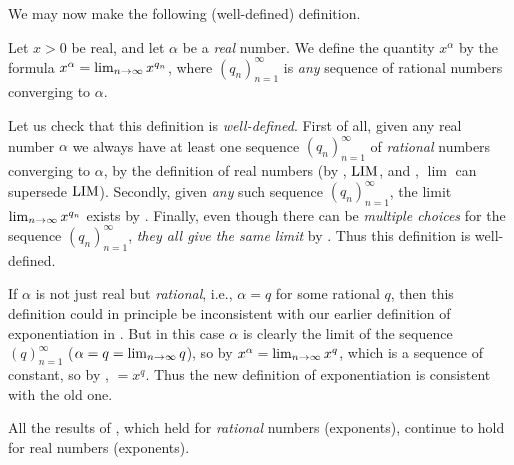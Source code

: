 We may now make the following (well-defined) definition.
\begin{definition}  \label{def 6.7.2}
Let \(x > 0\) be real, and let \(\alpha\) be a \emph{real} number.
We define the quantity \(x^{\alpha}\) by the formula \(x^{\alpha} = \lim_{n \to \infty} x^{q_n}\),
where \((q_n)_{n = 1}^{\infty}\) is \emph{any} sequence of rational numbers converging to \(\alpha\).
\end{definition}

\begin{note}
Let us check that this definition is \emph{well-defined}.
First of all, given any real number \(\alpha\) we always have at least one sequence \((q_n)_{n = 1}^{\infty}\) of \emph{rational} numbers converging to \(\alpha\),
by the definition of real numbers (by , \(\text{LIM}\), and , \(\lim\) can supersede \(\text{LIM}\)).
Secondly, given \emph{any} such sequence \((q_n)_{n = 1}^{\infty}\), the limit \(\lim_{n \to \infty} x^{q_n}\) exists by .
Finally, even though there can be \emph{multiple choices} for the sequence \((q_n)_{n = 1}^{\infty}\), \emph{they all give the same limit} by .
Thus this definition is well-defined.
\end{note}

\begin{note}
If \(\alpha\) is not just real but \emph{rational}, i.e., \(\alpha = q\) for some rational \(q\),
then this definition could in principle be inconsistent with our earlier definition of exponentiation in .
But in this case \(\alpha\) is clearly the limit of the sequence \((q)_{n = 1}^{\infty}\) (\(\alpha = q = \lim_{n \to \infty} q\)), so by  \(x^{\alpha} = \lim_{n \to \infty} x^q\), which is a sequence of constant, so by , \(= x^q\).
Thus the new definition of exponentiation is consistent with the old one.
\end{note}

\begin{proposition} \label{prop 6.7.3}
All the results of , which held for \emph{rational} numbers (exponents), continue to hold for real numbers (exponents).
\end{proposition}

